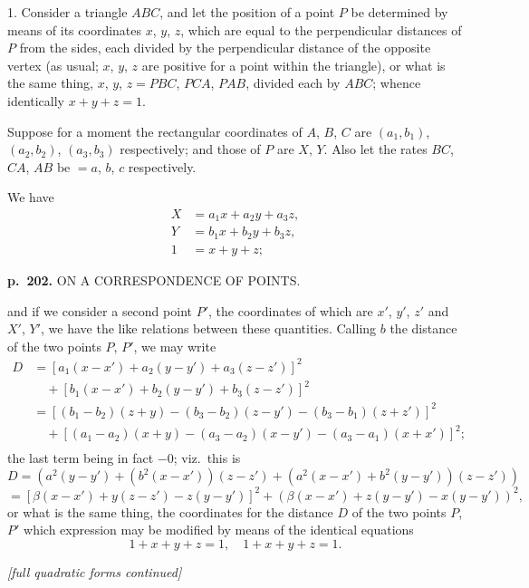 \documentclass[11pt,a4paper]{article}
\begin{document}
1. Consider a triangle $ABC$, and let the position of a point $P$ be determined by means of its coordinates $x$, $y$, $z$, which are equal to the perpendicular distances of $P$ from the sides, each divided by the perpendicular distance of the opposite vertex (as usual; $x$, $y$, $z$ are positive for a point within the triangle), or what is the same thing, $x$, $y$, $z = PBC$, $PCA$, $PAB$, divided each by $ABC$; whence identically $x + y + z = 1$.

Suppose for a moment the rectangular coordinates of $A$, $B$, $C$ are $(a_1, b_1)$, $(a_2, b_2)$, $(a_3, b_3)$ respectively; and those of $P$ are $X$, $Y$.  Also let the rates $BC$, $CA$, $AB$ be $= a$, $b$, $c$ respectively.

We have
\begin{align*}
X &= a_1 x + a_2 y + a_3 z, \\
Y &= b_1 x + b_2 y + b_3 z, \\
1 &= x + y + z;
\end{align*}

\clearpage

\noindent
\textbf{p.~202.}  ON A CORRESPONDENCE OF POINTS.

and if we consider a second point $P'$, the coordinates of which are $x'$, $y'$, $z'$ and $X'$, $Y'$, we have the like relations between these quantities.  Calling $b$ the distance of the two points $P$, $P'$, we may write
\begin{align*}
D &= [a_1(x - x') + a_2(y - y') + a_3(z - z')]^2 \\
&\quad + [b_1(x - x') + b_2(y - y') + b_3(z - z')]^2 \\
&= [(b_1 - b_2)(z + y) - (b_3 - b_2)(z - y') - (b_3 - b_1)(z + z')]^2 \\
&\quad + [(a_1 - a_2)(x + y) - (a_3 - a_2)(x - y') - (a_3 - a_1)(x + x')]^2; \\
\end{align*}
the last term being in fact $-0$; viz.\ this is
\[
D = (a^2 (y - y') + (b^2(x - x'))(z - z') + (a^2 (x - x') + b^2(y - y'))(z - z'))
\]
\[
= [\beta(x - x') + y(z - z') - z(y - y')]^2 + (\beta(x - x') + z(y - y') - x(y - y'))^2,
\]
or what is the same thing, the coordinates for the distance $D$ of the two points $P$, $P'$ which expression may be modified by means of the identical equations
\[
1 + x + y + z = 1, \quad 1 + x + y + z = 1.
\]

\textit{[full quadratic forms continued]}

\end{document}
